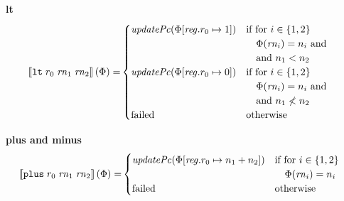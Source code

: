 \documentclass[a4paper]{article}
\begin{document}
\noindent\textbf{lt}\\
\begin{align*}
  \sem{\tlt{r_0}{\rn_1}{\rn_2}}(\Phi) = &
                                                  \begin{cases}
                                                    \updPcAddr{\Phi\updReg{r_0}{1}} &
                                                    \arraycolsep=0pt
                                                    \begin{array}[t]{l}
                                                      \text{if for $i \in \{1,2\}$}\\
                                                      \quad\Phi(\rn_i) = n_i \tand\\
                                                      \quad\text{and $n_1 < n_2$}\\        
                                                    \end{array}\\
                                                    \updPcAddr{\Phi\updReg{r_0}{0}} &
                                                    \arraycolsep=0pt
                                                    \begin{array}[t]{l}
                                                      \text{if for $i \in \{1,2\}$}\\
                                                      \quad \Phi(\rn_i) = n_i \tand \\
                                                      \quad\text{and $n_1 \not< n_2$}\\        
                                                    \end{array}\\
                                                    \failed & \text{otherwise}
                                                  \end{cases}  
\end{align*}

\noindent\textbf{plus and minus}\\
\begin{align*}
  \sem{\tplus{r_0}{\rn_1}{\rn_2}}(\Phi) = &
                                                  \begin{cases}
                                                    \updPcAddr{\Phi\updReg{r_0}{n_1+n_2}} &
                                                    \arraycolsep=0pt
                                                    \begin{array}[t]{l}
                                                      \text{if for $i \in \{1,2\}$}\\
                                                      \quad \Phi(\rn_i) = n_i\\
                                                    \end{array}\\
                                                    \failed & \text{otherwise}
                                                  \end{cases}  
\end{align*}
\end{document}
